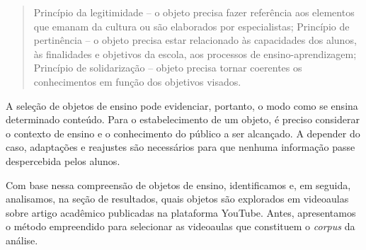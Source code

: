 \begin{quote}
Princípio da legitimidade -- o objeto precisa fazer referência aos
elementos que emanam da cultura ou são elaborados por especialistas;
Princípio de pertinência -- o objeto precisa estar relacionado às
capacidades dos alunos, às finalidades e objetivos da escola, aos
processos de ensino-aprendizagem; Princípio de solidarização -- objeto
precisa tornar coerentes os conhecimentos em função dos objetivos
visados.
\end{quote}

A seleção de objetos de ensino pode evidenciar, portanto, o modo como se
ensina determinado conteúdo. Para o estabelecimento de um objeto, é
preciso considerar o contexto de ensino e o conhecimento do público a
ser alcançado. A depender do caso, adaptações e reajustes são
necessários para que nenhuma informação passe despercebida pelos alunos.

Com base nessa compreensão de objetos de ensino, identificamos e, em
seguida, analisamos, na seção de resultados, quais objetos são
explorados em videoaulas sobre artigo acadêmico publicadas na plataforma
YouTube. Antes, apresentamos o método empreendido para selecionar as
videoaulas que constituem o \emph{corpus} da análise.
